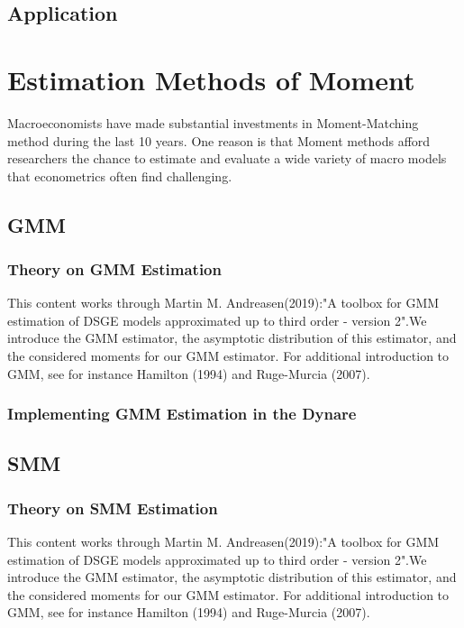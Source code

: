 \documentclass[cn,10pt,math=newtx,citestyle=gb7714-2015,bibstyle=gb7714-2015]{elegantbook}
\begin{document}
{{	
	\section{Application}
	
	
	
	
	
	\chapter{Estimation Methods of Moment}
	
	Macroeconomists have made substantial investments in Moment-Matching method during the last 10 years. One reason is that Moment methods afford researchers the chance to estimate and evaluate a wide variety of macro models that econometrics often find challenging.
	
	\section{GMM}
	
	\subsection{Theory on GMM Estimation}
	This content works through Martin M. Andreasen(2019):"A toolbox for GMM estimation of DSGE models approximated up to third order - version 2".We introduce the GMM estimator, the asymptotic distribution of this estimator, and the considered moments for our GMM estimator. For additional introduction to GMM, see for instance Hamilton (1994) and Ruge-Murcia (2007).
	
	\subsection{Implementing GMM Estimation in the Dynare}
	
	
	\section{SMM}
	
	\subsection{Theory on SMM Estimation}
	This content works through Martin M. Andreasen(2019):"A toolbox for GMM estimation of DSGE models approximated up to third order - version 2".We introduce the GMM estimator, the asymptotic distribution of this estimator, and the considered moments for our GMM estimator. For additional introduction to GMM, see for instance Hamilton (1994) and Ruge-Murcia (2007).
	
}}
\end{document}
